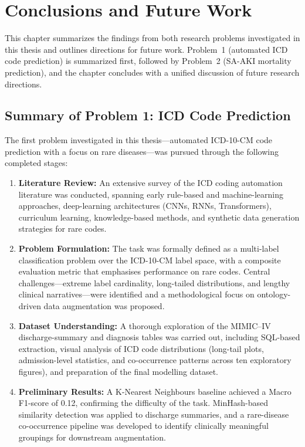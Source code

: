 \chapter{Conclusions and Future Work}\label{chap:conclusion}

This chapter summarizes the findings from both research problems investigated in this thesis and outlines directions for future work. Problem~1 (automated ICD code prediction) is summarized first, followed by Problem~2 (SA-AKI mortality prediction), and the chapter concludes with a unified discussion of future research directions.

\section{Summary of Problem 1: ICD Code Prediction}\label{sec:p1:conclusion}

The first problem investigated in this thesis---automated ICD-10-CM code prediction with a focus on rare diseases---was pursued through the following completed stages:

\begin{enumerate}
    \item \textbf{Literature Review:} An extensive survey of the ICD coding automation literature was conducted, spanning early rule-based and machine-learning approaches, deep-learning architectures (CNNs, RNNs, Transformers), curriculum learning, knowledge-based methods, and synthetic data generation strategies for rare codes.

    \item \textbf{Problem Formulation:} The task was formally defined as a multi-label classification problem over the ICD-10-CM label space, with a composite evaluation metric that emphasises performance on rare codes. Central challenges---extreme label cardinality, long-tailed distributions, and lengthy clinical narratives---were identified and a methodological focus on ontology-driven data augmentation was proposed.

    \item \textbf{Dataset Understanding:} A thorough exploration of the MIMIC--IV discharge-summary and diagnosis tables was carried out, including SQL-based extraction, visual analysis of ICD code distributions (long-tail plots, admission-level statistics, and co-occurrence patterns across ten exploratory figures), and preparation of the final modelling dataset.

    \item \textbf{Preliminary Results:} A K-Nearest Neighbours baseline achieved a Macro F1-score of 0.12, confirming the difficulty of the task. MinHash-based similarity detection was applied to discharge summaries, and a rare-disease co-occurrence pipeline was developed to identify clinically meaningful groupings for downstream augmentation.
\end{enumerate}


